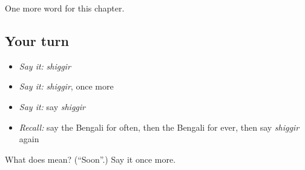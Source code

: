 \begin{grammarlens}[title={What you've built}]
One more word for this chapter.
\end{grammarlens}

\subsection*{Your turn}
\begin{itemize}
\raggedright
  \item \emph{Say it:} \emph{shiggir}
  \item \emph{Say it:} \emph{shiggir}, once more
  \item \emph{Say it:} say \emph{shiggir}
  \item \emph{Recall:} say the Bengali for often, then the Bengali for ever, then say \emph{shiggir} again
\end{itemize}

\begin{tcolorbox}[breakable,colback=teal!4,colframe=teal!35!black,title={Before you move on}]
What does  mean? (\textquotedblleft{}Soon\textquotedblright{}.) Say it once more.
\end{tcolorbox}
